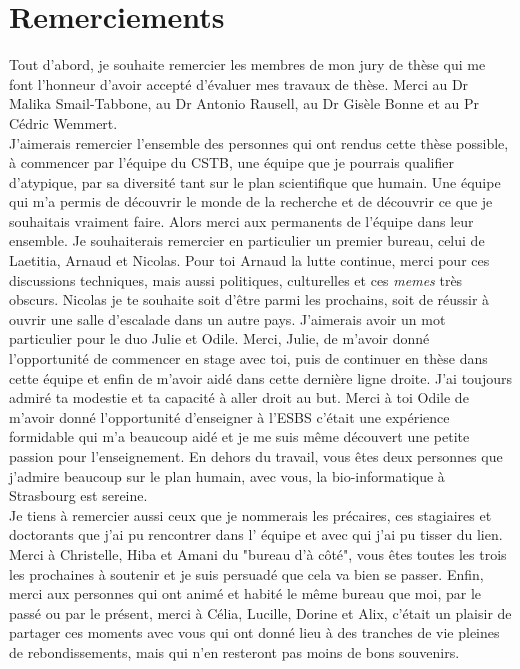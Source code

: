 \chapter{Remerciements}
Tout d'abord, je souhaite remercier les membres de mon jury de thèse qui me font l'honneur d'avoir accepté d'évaluer mes travaux de thèse. Merci au Dr Malika Smail-Tabbone, au Dr Antonio Rausell, au Dr Gisèle Bonne et au Pr Cédric Wemmert. \\

J'aimerais remercier l'ensemble des personnes qui ont rendus cette thèse possible, à commencer par l'équipe du CSTB, une équipe que je pourrais qualifier d'atypique, par sa diversité tant sur le plan scientifique que humain. Une équipe qui m'a permis de découvrir le monde de la recherche et de découvrir ce que je souhaitais vraiment faire. Alors merci aux permanents de l'équipe dans leur ensemble. Je souhaiterais remercier en particulier un premier bureau, celui de Laetitia, Arnaud et Nicolas. Pour toi Arnaud la lutte continue, merci pour ces discussions techniques, mais aussi politiques, culturelles et ces \textit{memes} très obscurs. Nicolas je te souhaite soit d'être parmi les prochains, soit de réussir à ouvrir une salle d'escalade dans un autre pays. J'aimerais avoir un mot particulier pour le duo Julie et Odile. Merci, Julie, de m'avoir donné l'opportunité de commencer en stage avec toi, puis de continuer en thèse dans cette équipe et enfin de m'avoir aidé dans cette dernière ligne droite. J'ai toujours admiré ta modestie et ta capacité à aller droit au but. Merci à toi Odile de m'avoir donné l'opportunité d'enseigner à l'ESBS c'était une expérience formidable qui m'a beaucoup aidé et je me suis même découvert une petite passion pour l'enseignement. En dehors du travail, vous êtes deux personnes que j'admire beaucoup sur le plan humain, avec vous, la bio-informatique à Strasbourg est sereine. \\

Je tiens à remercier aussi ceux que je nommerais les précaires, ces stagiaires et doctorants que j'ai pu rencontrer dans l' équipe et avec qui j'ai pu tisser du lien. Merci à Christelle, Hiba et Amani du "bureau d'à côté", vous êtes toutes les trois les prochaines à soutenir et je suis persuadé que cela va bien se passer. Enfin, merci aux personnes qui ont animé et habité le même bureau que moi, par le passé ou par le présent, merci à Célia, Lucille, Dorine et Alix, c'était un plaisir de partager ces moments avec vous qui ont donné lieu à des tranches de vie pleines de rebondissements, mais qui n'en resteront pas moins de bons souvenirs. \\

